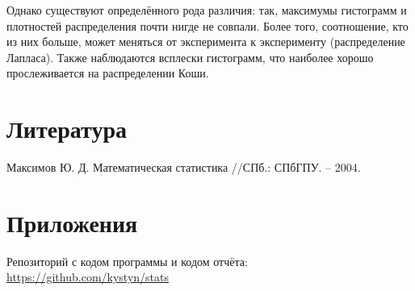 Однако существуют определённого рода различия: так, максимумы гистограмм и плотностей распределения почти нигде не совпали. Более того, соотношение, кто из них больше, может меняться от эксперимента к эксперименту (распределение Лапласа). Также наблюдаются всплески гистограмм, что наиболее хорошо прослеживается на распределении Коши.



\section{Литература}
Максимов Ю. Д. Математическая статистика //СПб.: СПбГПУ. – 2004.

\section{Приложения}

Репозиторий с кодом программы и кодом отчёта: \href{https://github.com/kystyn/stats}{https://github.com/kystyn/stats}



